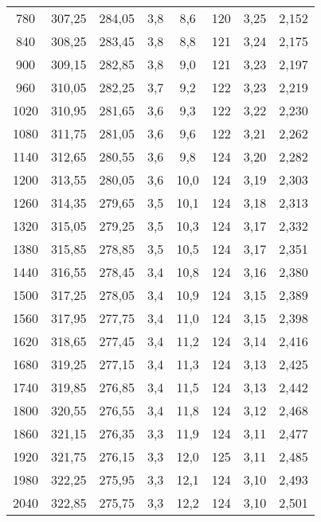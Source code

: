 \begin{table}[H]
\begin{tabular}{c c c c c c c c}
    780   &	 307,25  &	284,05	&	 3,8	&  8,6 	 &  120  & 	3,25	&   2,152  \\
    840   &	 308,25  & 	283,45	&	 3,8	&  8,8 	 &  121  &	3,24	&   2,175  \\
    900   &	 309,15  &	282,85	&	 3,8	&  9,0 	 &  121  &  3,23	&   2,197  \\
    960   &	 310,05  &  282,25	&	 3,7	&  9,2 	 &  122  &  3,23	&   2,219 \\
    1020  &	 310,95  &  281,65	&	 3,6	&  9,3 	 &  122  &  3,22	&   2,230 \\
    1080  &	 311,75  &  281,05	&	 3,6	&  9,6 	 &  122	 &  3,21	&   2,262 \\
    1140  &	 312,65  &  280,55	&	 3,6	&  9,8 	 &  124  &  3,20	&   2,282 \\
    1200  &	 313,55  &  280,05	&	 3,6	&  10,0  &	124  &  3,19	&   2,303  \\
    1260  &	 314,35  &  279,65	&	 3,5	&  10,1  &	124  &  3,18	&   2,313  \\
    1320	&  315,05  &  279,25	&	 3,5	&  10,3  &  124  &  3,17	&   2,332  \\
    1380	&  315,85  &  278,85	&	 3,5	&  10,5  &	124  &  3,17	&   2,351 \\
    1440	&  316,55  &	278,45	&	 3,4	&  10,8  &	124	 &  3,16	&   2,380  \\
    1500	&  317,25  & 	278,05	&	 3,4	&  10,9  &	124	 &  3,15	&   2,389 \\
    1560	&  317,95  &	277,75	&	 3,4	&  11,0  &	124  &  3,15	&   2,398  \\
    1620	&  318,65  & 	277,45	&	 3,4	&  11,2  &	124  &  3,14	&   2,416 \\
    1680	&  319,25  & 	277,15	&	 3,4	&  11,3  &	124  &  3,13	&   2,425 \\
    1740	&  319,85  & 	276,85	&  3,4	&  11,5  &	124  &  3,13	&   2,442 \\
    1800	&  320,55  & 	276,55	&  3,4	&  11,8  &	124  &  3,12	&   2,468 \\
    1860	&  321,15  &	276,35	&  3,3	&  11,9  &	124  &  3,11	&   2,477  \\
    1920	&  321,75  &	276,15  &	 3,3	&  12,0  &  125  &  3,11	&   2,485  \\
    1980	&  322,25  &  275,95  &	 3,3	&  12,1  &  124  &  3,10	&   2,493 \\
    2040	&  322,85  &  275,75  &	 3,3	&  12,2  &  124  &  3,10	&   2,501 \\

    \bottomrule
  \end{tabular}
\end{table}

